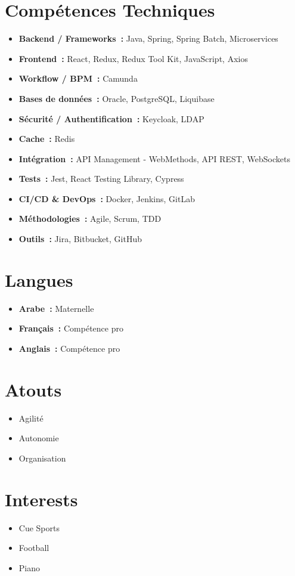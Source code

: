 \section*{Compétences Techniques}

\begin{itemize}
    \item \textbf{Backend / Frameworks~:} Java, Spring, Spring Batch, Microservices
    \item \textbf{Frontend~:} React, Redux, Redux Tool Kit, JavaScript, Axios
    \item \textbf{Workflow / BPM~:} Camunda
    \item \textbf{Bases de données~:} Oracle, PostgreSQL, Liquibase
    \item \textbf{Sécurité / Authentification~:} Keycloak, LDAP
    \item \textbf{Cache~:} Redis
    \item \textbf{Intégration~:} API Management - WebMethods, API REST, WebSockets
    \item \textbf{Tests~:} Jest, React Testing Library, Cypress
    \item \textbf{CI/CD \& DevOps~:} Docker, Jenkins, GitLab
    \item \textbf{Méthodologies~:} Agile, Scrum, TDD
    \item \textbf{Outils~:} Jira, Bitbucket, GitHub
\end{itemize}

\section*{Langues}

\begin{itemize}
    \item \textbf{Arabe~:} Maternelle
    \item \textbf{Français~:} Compétence pro
    \item \textbf{Anglais~:} Compétence pro
\end{itemize}

\section*{Atouts}

\begin{itemize}
    \item Agilité
    \item Autonomie
    \item Organisation
\end{itemize}

\section*{Interests}

\begin{itemize}
    \item Cue Sports
    \item Football
    \item Piano
\end{itemize}
